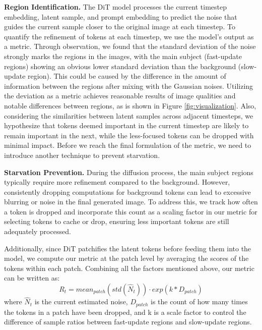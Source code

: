 \noindent \textbf{Region Identification.} The DiT model processes the current timestep embedding, latent sample, and prompt embedding to predict the noise that guides the current sample closer to the original image at each timestep. To quantify the refinement of tokens at each timestep, we use the model's output as a metric. Through observation, we found that the standard deviation of the noise strongly marks the regions in the images, with the main subject (fast-update regions) showing an obvious lower standard deviation than the background (slow-update region). This could be caused by the difference in the amount of information between the regions after mixing with the Gaussian noises. Utilizing the deviation as a metric achieves reasonable results of image qualities and notable differences between regions, as is shown in Figure \ref{fig:visualization}. 
Also, considering the similarities between latent samples across adjacent timesteps, we hypothesize that tokens deemed important in the current timestep are likely to remain important in the next, while the less-focused tokens can be dropped with minimal impact. Before we reach the final formulation of the metric, we need to introduce another technique to prevent starvation.

\noindent \textbf{Starvation Prevention.} During the diffusion process, the main subject regions typically require more refinement compared to the background. However, consistently dropping computations for background tokens can lead to excessive blurring or noise in the final generated image. To address this, we track how often a token is dropped and incorporate this count as a scaling factor in our metric for selecting tokens to cache or drop, ensuring less important tokens are still adequately processed.

\noindent Additionally, since DiT patchifies the latent tokens before feeding them into the model, we compute our metric at the patch level by averaging the scores of the tokens within each patch. Combining all the factors mentioned above, our metric can be written as:
\begin{equation}
\label{equa:metric}
    R_t = mean_{patch}(std(\hat{N}_t)) \cdot exp(k * D_{patch})
\end{equation}
where $\hat{N}_t$ is the current estimated noise, $D_{patch}$ is the count of how many times the tokens in a patch have been dropped, and k is a scale factor to control the difference of sample ratios between fast-update regions and slow-update regions.

